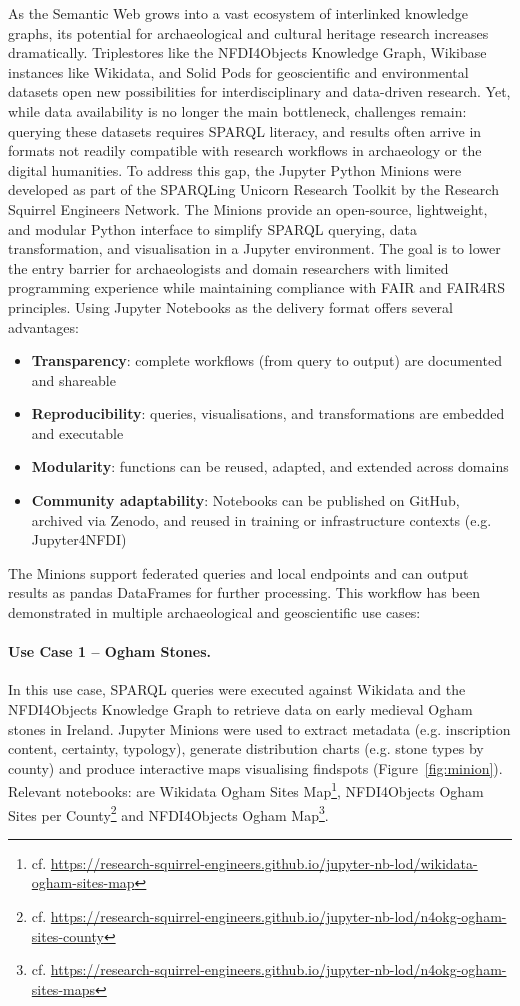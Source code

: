 \documentclass{eceasst}
\begin{document}
As the Semantic Web grows into a vast ecosystem of interlinked knowledge graphs, its potential for archaeological and cultural heritage research increases dramatically. Triplestores like the NFDI4Objects Knowledge Graph, Wikibase instances like Wikidata, and Solid Pods for geoscientific and environmental datasets open new possibilities for interdisciplinary and data-driven research. Yet, while data availability is no longer the main bottleneck, challenges remain: querying these datasets requires SPARQL literacy, and results often arrive in formats not readily compatible with research workflows in archaeology or the digital humanities. To address this gap, the Jupyter Python Minions were developed as part of the SPARQLing Unicorn Research Toolkit by the Research Squirrel Engineers Network. The Minions provide an open-source, lightweight, and modular Python interface to simplify SPARQL querying, data transformation, and visualisation in a Jupyter environment. The goal is to lower the entry barrier for archaeologists and domain researchers with limited programming experience while maintaining compliance with FAIR and FAIR4RS principles. Using Jupyter Notebooks as the delivery format offers several advantages:

\begin{itemize}
    \item \textbf{Transparency}: complete workflows (from query to output) are documented and shareable
    \item \textbf{Reproducibility}: queries, visualisations, and transformations are embedded and executable
    \item \textbf{Modularity}: functions can be reused, adapted, and extended across domains
    \item \textbf{Community adaptability}: Notebooks can be published on GitHub, archived via Zenodo, and reused in training or infrastructure contexts (e.g. Jupyter4NFDI)
\end{itemize}

The Minions support federated queries and local endpoints and can output results as pandas DataFrames for further processing. This workflow has been demonstrated in multiple archaeological and geoscientific use cases:

\paragraph{Use Case 1 – Ogham Stones.} In this use case, SPARQL queries were executed against Wikidata and the NFDI4Objects Knowledge Graph to retrieve data on early medieval Ogham stones in Ireland. Jupyter Minions were used to extract metadata (e.g. inscription content, certainty, typology), generate distribution charts (e.g. stone types by county) and produce interactive maps visualising findspots (Figure~\ref{fig:minion}). Relevant notebooks: are Wikidata Ogham Sites Map\footnote{cf. \url{https://research-squirrel-engineers.github.io/jupyter-nb-lod/wikidata-ogham-sites-map}}, NFDI4Objects Ogham Sites per County\footnote{cf. \url{https://research-squirrel-engineers.github.io/jupyter-nb-lod/n4okg-ogham-sites-county}} and NFDI4Objects Ogham Map\footnote{cf. \url{https://research-squirrel-engineers.github.io/jupyter-nb-lod/n4okg-ogham-sites-maps}}.
\end{document}

